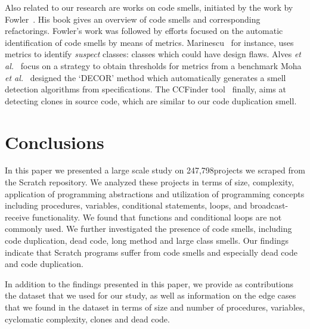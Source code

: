 \documentclass{sig-alternate}
\newcommand{\nAnalyzedPrograms}{247,798}
\begin{document}
Also related to our research are works on code smells, initiated by the work by Fowler~\cite{fowler_refactoring:_1999}. His book gives an overview of code smells and corresponding refactorings. Fowler's work was followed by efforts focused on the automatic identification of code smells by means of metrics. Marinescu~\cite{marinescu_detecting_2001} for instance, uses metrics to identify \emph{suspect} classes: classes which could have design flaws. Alves \emph{et al.}~\cite{alves_deriving_2010} focus on a strategy to obtain thresholds for metrics from a benchmark Moha \emph{et al.}~\cite{moha_decor:_2010} designed the `DECOR' method which automatically generates a smell detection algorithms from specifications. The CCFinder tool~\cite{kamiya_ccfinder:_2002} finally, aims at detecting clones in source code, which are similar to our code duplication smell.

\section{Conclusions}
\label{sec:conclusion}
In this paper we presented a large scale study on \nAnalyzedPrograms projects we scraped from the Scratch repository. We analyzed these projects in terms of size, complexity, application of programming abstractions and utilization of programming concepts including procedures, variables, conditional statements, loops, and broadcast-receive functionality. We found that functions and conditional loops are not commonly used. We further investigated the presence of code smells, including code duplication, dead code, long method and large class smells. Our findings indicate that Scratch programs suffer from code smells and especially dead code and code duplication.

In addition to the findings presented in this paper, we provide as contributions the dataset that we used for our study, as well as information on the edge cases that we found in the dataset in terms of size and number of procedures, variables, cyclomatic complexity, clones and dead code.\footnotemark[\ref{repo}]



\end{document}
